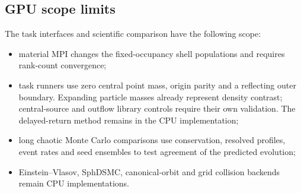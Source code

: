 \subsection{GPU scope limits}

The task interfaces and scientific comparison have the following scope:
\begin{itemize}
\item material MPI changes the fixed-occupancy shell populations and requires
rank-count convergence;
\item task runners use zero central point mass, origin parity and a reflecting
outer boundary. Expanding particle masses already represent density contrast;
central-source and outflow library controls require their own validation.
The delayed-return method remains in the CPU implementation;
\item long chaotic Monte Carlo comparisons use conservation, resolved profiles,
event rates and seed ensembles to test agreement of the predicted evolution;
\item Einstein--Vlasov, SphDSMC, canonical-orbit and grid collision backends
remain CPU implementations.
\end{itemize}
